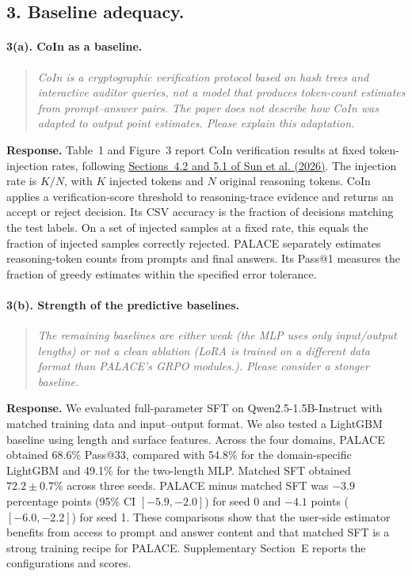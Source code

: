 \documentclass[11pt]{article}
\begin{document}
\subsection*{3. Baseline adequacy.}
\paragraph{3(a). CoIn as a baseline.}
\begin{quote}\small\itshape
CoIn is a cryptographic verification protocol based on hash trees and interactive auditor queries, not a model that produces token-count estimates from prompt--answer pairs. The paper does not describe how CoIn was adapted to output point estimates. Please explain this adaptation.
\end{quote}
\textbf{Response.} Table~1 and Figure~3 report CoIn verification results at fixed token-injection rates, following \href{https://aclanthology.org/2026.findings-emnlp.363/}{Sections~4.2 and 5.1 of Sun et al. (2026)}. The injection rate is \(K/N\), with \(K\) injected tokens and \(N\) original reasoning tokens. CoIn applies a verification-score threshold to reasoning-trace evidence and returns an accept or reject decision. Its CSV accuracy is the fraction of decisions matching the test labels. On a set of injected samples at a fixed rate, this equals the fraction of injected samples correctly rejected. PALACE separately estimates reasoning-token counts from prompts and final answers. Its Pass@1 measures the fraction of greedy estimates within the specified error tolerance.

\paragraph{3(b). Strength of the predictive baselines.}
\begin{quote}\small\itshape
The remaining baselines are either weak (the MLP uses only input/output lengths) or not a clean ablation (LoRA is trained on a different data format than PALACE's GRPO modules.). Please consider a stonger baseline.
\end{quote}
\textbf{Response.} We evaluated full-parameter SFT on Qwen2.5-1.5B-Instruct with matched training data and input--output format. We also tested a LightGBM baseline using length and surface features. Across the four domains, PALACE obtained 68.6\% Pass@33, compared with 54.8\% for the domain-specific LightGBM and 49.1\% for the two-length MLP. Matched SFT obtained \(72.2\pm0.7\%\) across three seeds. PALACE minus matched SFT was \(-3.9\) percentage points (95\% CI \([-5.9,-2.0]\)) for seed 0 and \(-4.1\) points (\([-6.0,-2.2]\)) for seed 1. These comparisons show that the user-side estimator benefits from access to prompt and answer content and that matched SFT is a strong training recipe for PALACE. Supplementary Section~E reports the configurations and scores.
\end{document}
